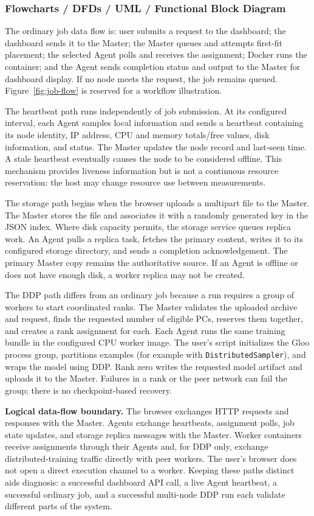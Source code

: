 \documentclass{article}
\begin{document}
	\subsubsection{Flowcharts / DFDs / UML / Functional Block Diagram}
The ordinary job data flow is: user submits a request to the dashboard; the dashboard sends it to the Master; the Master queues and attempts first-fit placement; the selected Agent polls and receives the assignment; Docker runs the container; and the Agent sends completion status and output to the Master for dashboard display. If no node meets the request, the job remains queued. Figure~\ref{fig:job-flow} is reserved for a workflow illustration.

The heartbeat path runs independently of job submission. At its configured interval, each Agent samples local information and sends a heartbeat containing its node identity, IP address, CPU and memory totals/free values, disk information, and status. The Master updates the node record and last-seen time. A stale heartbeat eventually causes the node to be considered offline. This mechanism provides liveness information but is not a continuous resource reservation: the host may change resource use between measurements.

The storage path begins when the browser uploads a multipart file to the Master. The Master stores the file and associates it with a randomly generated key in the JSON index. Where disk capacity permits, the storage service queues replica work. An Agent pulls a replica task, fetches the primary content, writes it to its configured storage directory, and sends a completion acknowledgement. The primary Master copy remains the authoritative source. If an Agent is offline or does not have enough disk, a worker replica may not be created.

The DDP path differs from an ordinary job because a run requires a group of workers to start coordinated ranks. The Master validates the uploaded archive and request, finds the requested number of eligible PCs, reserves them together, and creates a rank assignment for each. Each Agent runs the same training bundle in the configured CPU worker image. The user's script initializes the Gloo process group, partitions examples (for example with \texttt{DistributedSampler}), and wraps the model using DDP. Rank zero writes the requested model artifact and uploads it to the Master. Failures in a rank or the peer network can fail the group; there is no checkpoint-based recovery.

\textbf{Logical data-flow boundary.} The browser exchanges HTTP requests and responses with the Master. Agents exchange heartbeats, assignment polls, job state updates, and storage replica messages with the Master. Worker containers receive assignments through their Agents and, for DDP only, exchange distributed-training traffic directly with peer workers. The user's browser does not open a direct execution channel to a worker. Keeping these paths distinct aids diagnosis: a successful dashboard API call, a live Agent heartbeat, a successful ordinary job, and a successful multi-node DDP run each validate different parts of the system.
\end{document}
